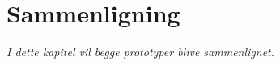 \chapter{Sammenligning}\label{kap:sammenligning}

\emph{I dette kapitel vil begge prototyper blive sammenlignet.}